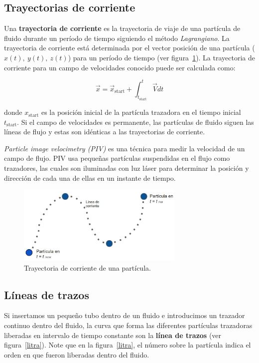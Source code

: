 \documentclass[10pt, oneside]{article}
\begin{document}
\subsection{Trayectorias de corriente}

Una \textbf{trayectoria de corriente} es la trayectoria de viaje de una partícula de fluido durante un período de tiempo siguiendo el método \emph{Lagrangiano}. La trayectoria de corriente está determinada por el vector posición de una partícula ($x(t),\ y(t),\ z(t)$) para un período de tiempo (ver figura~\ref{pathl}). La trayectoria de corriente para un campo de velocidades conocido puede ser calculada como:



\begin{equation}
\vec{x} = \vec{x}_{\text{start}} + \int_{t_{\text{start}}}^t \vec{V} dt
\label{patl}
\end{equation}

donde $x_{\text{start}}$ es la posición inicial de la partícula trazadora en el tiempo inicial $t_{\text{start}}$. Si el campo de velocidades es permanente, las partículas de fluido siguen las líneas de flujo y estas son idénticas a las trayectorias de corriente.

\emph{Particle image velocimetry (PIV)} es una técnica para medir la velocidad de un campo de flujo. PIV usa pequeñas partículas suspendidas en el flujo como trazadores, las cuales son iluminadas con luz láser para determinar la posición y dirección de cada una de ellas en un instante de tiempo.

\begin{figure}[h]
\centering
\includegraphics[width=8cm]{Fig.4.jpg}
\caption{Trayectoria de corriente de una partícula.}
\label{pathl}
\end{figure}

\subsection{Líneas de trazos}

Si insertamos un pequeño tubo dentro de un fluido e introducimos un trazador continuo dentro del fluido, la curva que forma las diferentes partículas trazadoras liberadas en intervalo de tiempo constante son la \textbf{línea de trazos} (ver figura~\ref{litra}). Note que en la figura~\ref{litra}, el número sobre la partícula indica el orden en que fueron liberadas dentro del fluido.
\end{document}
